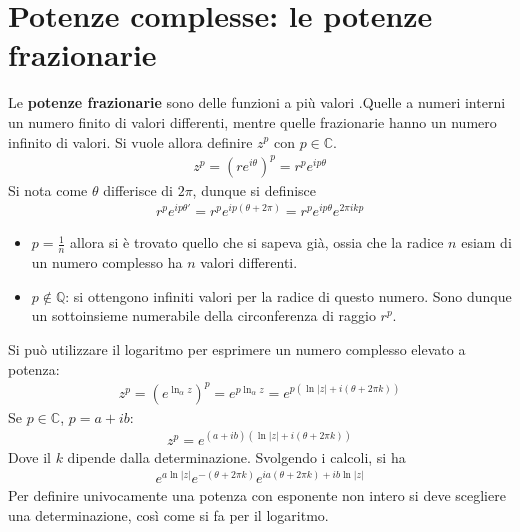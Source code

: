 \documentclass[a4paper, oneside]{article}
\begin{document}
\section{Potenze complesse: le potenze frazionarie}
Le \textbf{potenze frazionarie} sono delle funzioni a più valori .Quelle
a numeri interni un numero finito di valori differenti, mentre quelle frazionarie hanno 
un numero infinito di valori. Si vuole allora definire  $z^{p}$ con $p \in \mathbb{C}$.
\begin{gather*}
    z^{p} = (r e^{i\theta})^{p} = r^{p}e^{ip\theta}
\end{gather*}
Si nota come $\theta$ differisce di $2\pi$, dunque si definisce
\begin{gather*}
    r^{p}e^{ip\theta'} = r^{p}e^{ip(\theta + 2\pi)} = r^{p}e^{ip\theta}e^{2\pi i k p}
\end{gather*}
\begin{itemize}
    \item $p = \frac{1}{n}$ allora si è trovato quello che si sapeva già, ossia che la radice $n$ esiam di un numero 
complesso ha $n$ valori differenti.
    \item $p \not \in \mathbb{Q}$: si ottengono infiniti valori per la 
    radice di questo numero. Sono dunque un sottoinsieme numerabile della circonferenza
    di raggio $r^{p}$.
\end{itemize}
Si può utilizzare il logaritmo per esprimere un numero complesso elevato a potenza:
\begin{gather*}
    z^{p} = \left(e^{\ln_\alpha z}\right)^{p} = e^{p\ln_\alpha z} = e^{p\left(\ln \left| z \right| + i(\theta + 2\pi k)\right)}
\end{gather*}
Se $p \in \mathbb{C}$, $p = a + ib$:
\begin{gather*}
    z^{p} = e^{(a + ib)(\ln \left| z \right| + i(\theta + 2\pi k) )}
\end{gather*}
Dove il $k$ dipende dalla determinazione. Svolgendo i calcoli, si ha
\begin{gather*}
    e^{a\ln \left| z \right| }e^{-(\theta + 2\pi k)} e^{ia(\theta + 2\pi k ) + ib\ln \left| z \right| }
\end{gather*}
Per definire univocamente una potenza con esponente non intero si deve scegliere 
una determinazione, così come si fa per il logaritmo. 
\end{document}
